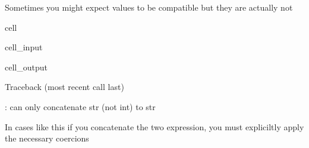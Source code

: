 \documentclass[letterpaper,10pt,english]{jupyterBook}
\begin{document}
\sphinxAtStartPar
Sometimes you might expect values to be compatible but they are actually not

\begin{sphinxuseclass}{cell}\begin{sphinxVerbatimInput}

\begin{sphinxuseclass}{cell_input}
\begin{sphinxVerbatim}[commandchars=\\\{\}]
  
\end{sphinxVerbatim}

\end{sphinxuseclass}\end{sphinxVerbatimInput}
\begin{sphinxVerbatimOutput}

\begin{sphinxuseclass}{cell_output}
\begin{sphinxVerbatim}[commandchars=\\\{\}]
Traceback (most recent call last)
 \PYG{p}{[}\PYG{p}{]}  
   

: can only concatenate str (not \PYGZdq{}int\PYGZdq{}) to str
\end{sphinxVerbatim}

\end{sphinxuseclass}\end{sphinxVerbatimOutput}

\end{sphinxuseclass}
\sphinxAtStartPar
In cases like this if you concatenate the two expression, you must expliciltly apply the necessary coercions
\end{document}
